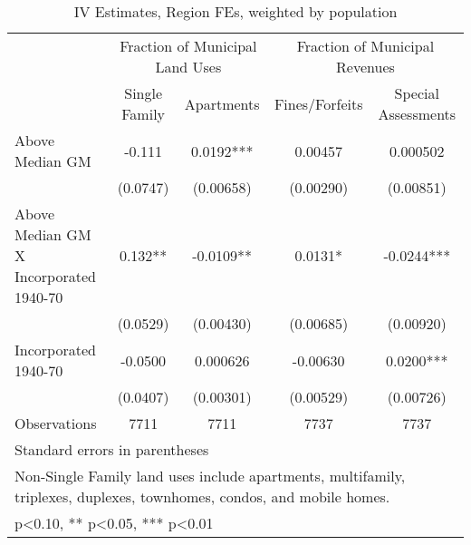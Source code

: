 \begin{table}[htbp]\centering
\def\sym#1{\ifmmode^{#1}\else\(^{#1}\)\fi}
\caption{IV Estimates, Region FEs, weighted by population}
\begin{tabular}{l*{4}{c}}
\toprule
                    &\multicolumn{2}{c}{Fraction of Municipal Land Uses}&\multicolumn{2}{c}{Fraction of Municipal Revenues}\\\cmidrule(lr){2-3}\cmidrule(lr){4-5}
                    &\multicolumn{1}{c}{Single Family}&\multicolumn{1}{c}{Apartments}&\multicolumn{1}{c}{Fines/Forfeits}&\multicolumn{1}{c}{Special Assessments}\\
\midrule
Above Median GM     &      -0.111   &      0.0192***&     0.00457   &    0.000502   \\
                    &    (0.0747)   &   (0.00658)   &   (0.00290)   &   (0.00851)   \\
\addlinespace
Above Median GM X Incorporated 1940-70&       0.132** &     -0.0109** &      0.0131*  &     -0.0244***\\
                    &    (0.0529)   &   (0.00430)   &   (0.00685)   &   (0.00920)   \\
\addlinespace
Incorporated 1940-70&     -0.0500   &    0.000626   &    -0.00630   &      0.0200***\\
                    &    (0.0407)   &   (0.00301)   &   (0.00529)   &   (0.00726)   \\
\midrule
Observations        &        7711   &        7711   &        7737   &        7737   \\
\bottomrule
\multicolumn{5}{l}{\footnotesize Standard errors in parentheses}\\
\multicolumn{5}{l}{\footnotesize Non-Single Family land uses include apartments, multifamily, triplexes, duplexes, townhomes, condos, and mobile homes.}\\
\multicolumn{5}{l}{\footnotesize * p<0.10, ** p<0.05, *** p<0.01}\\
\end{tabular}
\end{table}
